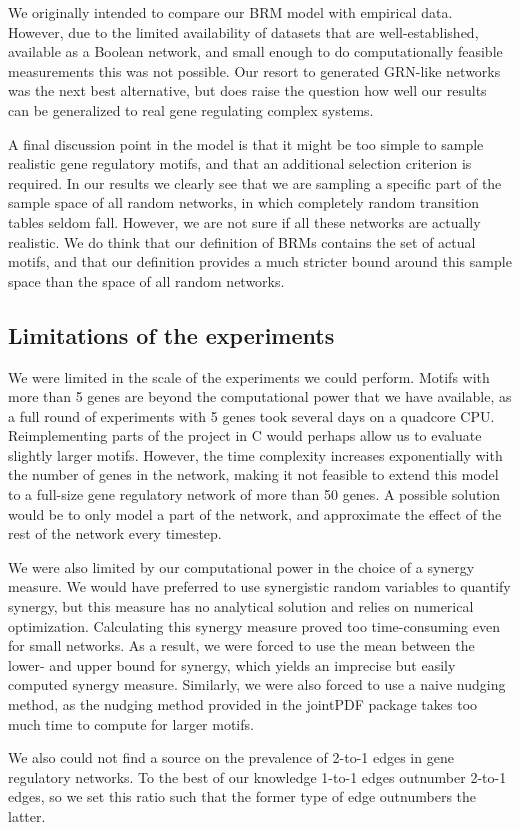\documentclass[../main.tex]{subfiles}
\begin{document}
We originally intended to compare our BRM model with empirical data.
However, due to the limited availability of datasets that are well-established, available as a Boolean network, and small enough to do computationally feasible measurements this was not possible.
Our resort to generated GRN-like networks was the next best alternative, but does raise the question how well our results can be generalized to real gene regulating complex systems.

A final discussion point in the model is that it might be too simple to sample realistic gene regulatory motifs, and that an additional selection criterion is required.
In our results we clearly see that we are sampling a specific part of the sample space of all random networks, in which completely random transition tables seldom fall.
However, we are not sure if all these networks are actually realistic.
We do think that our definition of BRMs contains the set of actual motifs, and that our definition provides a much stricter bound around this sample space than the space of all random networks.

\subsection{Limitations of the experiments}

We were limited in the scale of the experiments we could perform.
Motifs with more than 5 genes are beyond the computational power that we have available, as a full round of experiments with 5 genes took several days on a quadcore CPU. %
Reimplementing parts of the project in C would perhaps allow us to evaluate slightly larger motifs.
However, the time complexity increases exponentially with the number of genes in the network, making it not feasible to extend this model to a full-size gene regulatory network of more than 50 genes.
A possible solution would be to only model a part of the network, and approximate the effect of the rest of the network every timestep.

We were also limited by our computational power in the choice of a synergy measure.
We would have preferred to use synergistic random variables to quantify synergy, but this measure has no analytical solution and relies on numerical optimization. 
Calculating this synergy measure proved too time-consuming even for small networks.
As a result, we were forced to use the mean between the lower- and upper bound for synergy, which yields an imprecise but easily computed synergy measure.
Similarly, we were also forced to use a naive nudging method, as the nudging method provided in the jointPDF package takes too much time to compute for larger motifs.

We also could not find a source on the prevalence of 2-to-1 edges in gene regulatory networks.
To the best of our knowledge 1-to-1 edges outnumber 2-to-1 edges, so we set this ratio such that the former type of edge outnumbers the latter.
\end{document}
